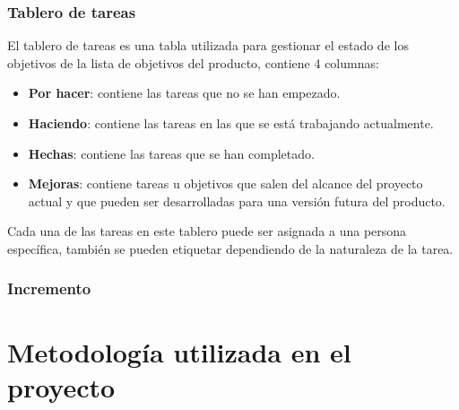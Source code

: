 \subsubsection{Tablero de tareas}
El tablero de tareas es una tabla utilizada para gestionar el estado de los objetivos de la lista de objetivos del producto, contiene 4 columnas:

\begin{itemize}
    \item \textbf{Por hacer}: contiene las tareas que no se han empezado.
    \item \textbf{Haciendo}: contiene las tareas en las que se está trabajando actualmente.
    \item \textbf{Hechas}: contiene las tareas que se han completado.
    \item \textbf{Mejoras}: contiene tareas u objetivos que salen del alcance del proyecto actual y que pueden ser desarrolladas para una versión futura del producto.
\end{itemize}

Cada una de las tareas en este tablero puede ser asignada a una persona específica, también se pueden etiquetar dependiendo de la naturaleza de la tarea.

\subsubsection{Incremento} \label{increment}

\section{Metodología utilizada en el proyecto}